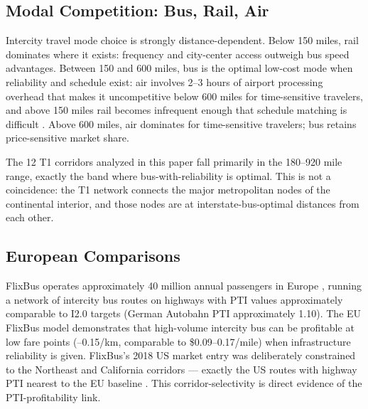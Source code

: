 \subsection{Modal Competition: Bus, Rail, Air}

Intercity travel mode choice is strongly distance-dependent. Below 150 miles, rail dominates where it exists: frequency and city-center access outweigh bus speed advantages. Between 150 and 600 miles, bus is the optimal low-cost mode when reliability and schedule exist: air involves 2--3 hours of airport processing overhead that makes it uncompetitive below 600 miles for time-sensitive travelers, and above 150 miles rail becomes infrequent enough that schedule matching is difficult \citep{BTS_intermodal2023}. Above 600 miles, air dominates for time-sensitive travelers; bus retains price-sensitive market share.

The 12 T1 corridors analyzed in this paper fall primarily in the 180--920 mile range, exactly the band where bus-with-reliability is optimal. This is not a coincidence: the T1 network connects the major metropolitan nodes of the continental interior, and those nodes are at interstate-bus-optimal distances from each other.

\subsection{European Comparisons}

FlixBus operates approximately 40 million annual passengers in Europe \citep{FlixBus2023}, running a network of intercity bus routes on highways with PTI values approximately comparable to I2.0 targets (German Autobahn PTI approximately 1.10). The EU FlixBus model demonstrates that high-volume intercity bus can be profitable at low fare points (--0.15/km, comparable to \$0.09--0.17/mile) when infrastructure reliability is given. FlixBus's 2018 US market entry was deliberately constrained to the Northeast and California corridors --- exactly the US routes with highway PTI nearest to the EU baseline \citep{FlixBus2023}. This corridor-selectivity is direct evidence of the PTI-profitability link.

